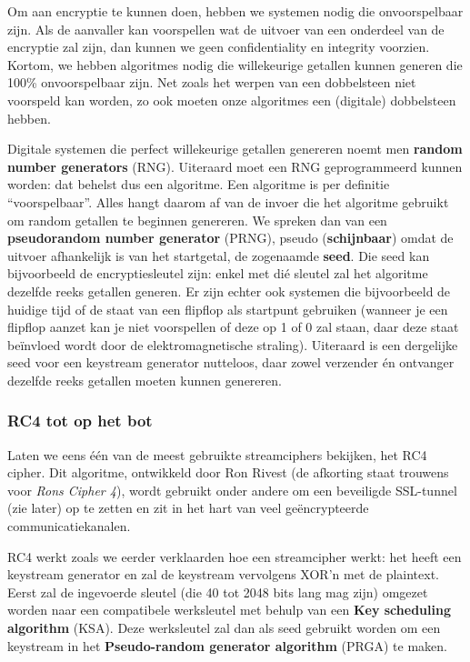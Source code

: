 \documentclass[
  10pt,
  dutch,
  paper=a4,
  ,captions=tableheading
]{scrbook}
\begin{document}
Om aan encryptie te kunnen doen, hebben we systemen nodig die
onvoorspelbaar zijn. Als de aanvaller kan voorspellen wat de uitvoer van
een onderdeel van de encryptie zal zijn, dan kunnen we geen
confidentiality en integrity voorzien. Kortom, we hebben algoritmes
nodig die willekeurige getallen kunnen generen die 100\% onvoorspelbaar
zijn. Net zoals het werpen van een dobbelsteen niet voorspeld kan
worden, zo ook moeten onze algoritmes een (digitale) dobbelsteen hebben.

Digitale systemen die perfect willekeurige getallen genereren noemt men
\textbf{random number generators} (RNG). Uiteraard moet een RNG
geprogrammeerd kunnen worden: dat behelst dus een algoritme. Een
algoritme is per definitie ``voorspelbaar''. Alles hangt daarom af van
de invoer die het algoritme gebruikt om random getallen te beginnen
genereren. We spreken dan van een \textbf{pseudorandom number generator}
(PRNG), pseudo (\textbf{schijnbaar}) omdat de uitvoer afhankelijk is van
het startgetal, de zogenaamde \textbf{seed}. Die seed kan bijvoorbeeld
de encryptiesleutel zijn: enkel met dié sleutel zal het algoritme
dezelfde reeks getallen generen. Er zijn echter ook systemen die
bijvoorbeeld de huidige tijd of de staat van een flipflop als startpunt
gebruiken (wanneer je een flipflop aanzet kan je niet voorspellen of
deze op 1 of 0 zal staan, daar deze staat beïnvloed wordt door de
elektromagnetische straling). Uiteraard is een dergelijke seed voor een
keystream generator nutteloos, daar zowel verzender én ontvanger
dezelfde reeks getallen moeten kunnen genereren.

\subsubsection{RC4 tot op het bot}\label{rc4-tot-op-het-bot}

Laten we eens één van de meest gebruikte streamciphers bekijken, het RC4
cipher. Dit algoritme, ontwikkeld door Ron Rivest (de afkorting staat
trouwens voor \emph{Rons Cipher 4}), wordt gebruikt onder andere om een
beveiligde SSL-tunnel (zie later) op te zetten en zit in het hart van
veel geëncrypteerde communicatiekanalen.

RC4 werkt zoals we eerder verklaarden hoe een streamcipher werkt: het
heeft een keystream generator en zal de keystream vervolgens XOR'n met
de plaintext. Eerst zal de ingevoerde sleutel (die 40 tot 2048 bits lang
mag zijn) omgezet worden naar een compatibele werksleutel met behulp van
een \textbf{Key scheduling algorithm} (KSA). Deze werksleutel zal dan
als seed gebruikt worden om een keystream in het \textbf{Pseudo-random
generator algorithm} (PRGA) te maken.
\end{document}
